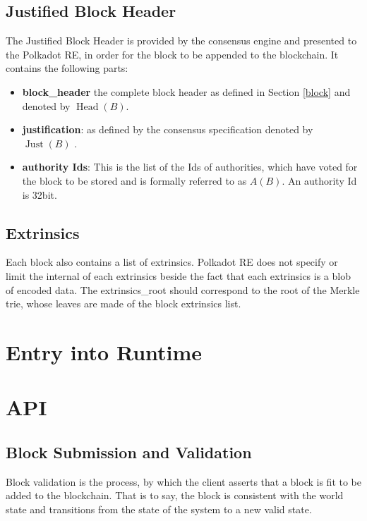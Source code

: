 \documentclass{article}
\newcommand{\tmop}[1]{\ensuremath{\operatorname{#1}}}
\newcommand{\tmsamp}[1]{\textsf{#1}}
\newcommand{\tmstrong}[1]{\textbf{#1}}
\begin{document}
\subsection{Justified Block Header}

The Justified Block Header is provided by the consensus engine and presented
to the Polkadot RE, in order for the block to be appended to the blockchain.
It contains the following parts:
\begin{itemize}
  \item {\tmstrong{{\tmsamp{{\tmstrong{block\_header}}}}}} the complete block
  header as defined in Section \ref{block} and denoted by $\tmop{Head} (B)$.
  
  \item {\tmstrong{{\tmsamp{justification}}}}: as defined by the consensus
  specification denoted by $\tmop{Just} (B)$ {}.
  
  \item {\tmstrong{{\tmsamp{authority Ids}}}}: This is the list of the Ids of
  authorities, which have voted for the block to be stored and is formally
  referred to as $A (B)$. An authority Id is 32bit.
\end{itemize}

\subsection{Extrinsics}

Each block also contains a list of extrinsics. Polkadot RE does not specify or
limit the internal of each extrinsics beside the fact that each extrinsics is
a blob of encoded data. The {\tmsamp{extrinsics\_root}} should correspond to
the root of the Merkle trie, whose leaves are made of the block extrinsics
list.

\section{Entry into Runtime}

\section{API}

\subsection{Block Submission and Validation}

Block validation is the process, by which the client asserts that a block is
fit to be added to the blockchain. That is to say, the block is consistent
with the world state and transitions from the state of the system to a new
valid state.
\end{document}
